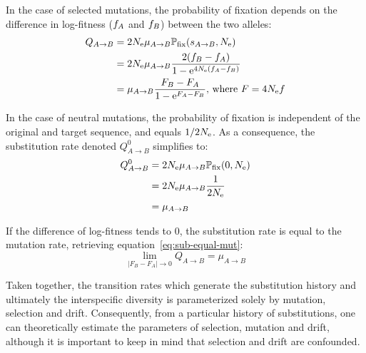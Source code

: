 In the case of selected mutations, the probability of fixation depends on the difference in log-fitness ($f_A$ and $f_B$) between the two \glspl{allele}:
\begin{align}
    Q_{A \to B} & = 2 N_{\text{e}} \mu_{A \to B} \mathbb{P}_{\text{fix}}(s_{A \to B}, N_{\text{e}}) \\
    & = 2 N_{\text{e}} \mu_{A \to B}  \dfrac{2(f_{B} - f_{A})}{1 - \text{e}^{4N_{\text{e}}(f_{A} - f_{B})} } \\
    & = \mu_{A \to B} \dfrac{F_{B} - F_{A}}{1 - \text{e}^{F_{A} - F_{B}} }\text{, where } F = 4N_{\text{e}} f \label{eq:sub-transion-rates}
\end{align}

In the case of \gls{neutral} mutations, the probability of fixation is independent of the original and target sequence, and equals $1/2 N_{\text{e}}$.
As a consequence, the \gls{substitution} rate denoted $Q_{A \to B}^{0}$ simplifies to:
\begin{align}
    Q_{A \to B}^{0} & = 2 N_{\text{e}} \mu_{A \to B}  \mathbb{P}_{\text{fix}}(0, N_{\text{e}}) \\
    & = 2 N_{\text{e}} \mu_{A \to B} \dfrac{1}{2N_{\text{e}}} \\
    & = \mu_{A \to B} \label{eq:sub-equal-mut}
\end{align}


If the difference of log-fitness tends to $0$, the \gls{substitution} rate is equal to the mutation rate, retrieving equation~\ref{eq:sub-equal-mut}:
\begin{equation}
    \lim\limits_{|F_{B} - F_{A}| \to 0} Q_{A \to B} =  \mu_{A \to B}
\end{equation}

Taken together, the transition rates which generate the \gls{substitution} history and ultimately the interspecific diversity is parameterized solely by mutation, selection and drift.
Consequently, from a particular history of \glspl{substitution}, one can theoretically estimate the parameters of selection, mutation and drift, although it is important to keep in mind that selection and drift are confounded.


